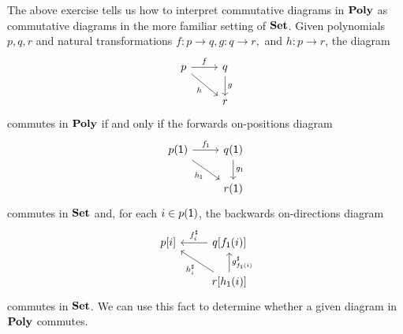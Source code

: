 \documentclass[Book-Poly]{subfiles}
\begin{document}
\begin{example} \label{ex.comm_poly}
The above exercise tells us how to interpret commutative diagrams in $\mathbf{Poly}$ as commutative diagrams in the more familiar setting of $\mathbf{Set}$.
Given polynomials $p, q, r$ and natural transformations $f \colon p \to q, g \colon q \to r,$ and $h \colon p \to r$, the diagram
\[
\begin{tikzcd}
    p \ar[r, "f"] \ar[dr, "h"'] & q \ar[d, "g"] \\
    & r
\end{tikzcd}
\]
commutes in $\mathbf{Poly}$ if and only if the forwards on-positions diagram
\[
\begin{tikzcd}
    p(\1) \ar[r, "f_\1"] \ar[dr, "h_\1"'] & q(\1) \ar[d, "g_\1"] \\
    & r(\1)
\end{tikzcd}
\]
commutes in $\mathbf{Set}$ and, for each $i \in p(\textsf{1})$, the backwards on-directions diagram
\[
\begin{tikzcd}
    p[i] & q[f_\1(i)] \ar[l, "f^\sharp_i"'] \\
    & r[h_\1(i)] \ar[u, "g^\sharp_{f_\1(i)}"'] \ar[ul, "h^\sharp_i"]
\end{tikzcd}
\]
commutes in $\mathbf{Set}$.
We can use this fact to determine whether a given diagram in $\mathbf{Poly}$ commutes.
\end{example}
\end{document}
